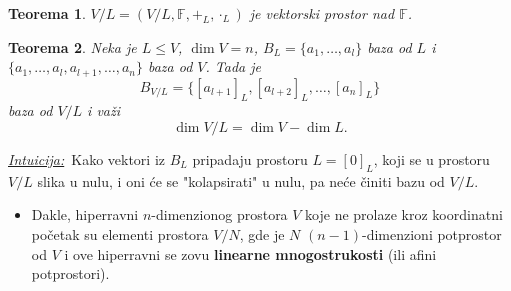 \documentclass[a4paper,12pt,twoside]{report}
\newtheorem{theorem}{Teorema}[section]
\numberwithin{algorithm}{section}
\newcommand{\intuicija}{\noindent\underline{\textit{Intuicija:}}\ }
\begin{document}
\begin{theorem}
    $V/L = (V/L, \mathbb{F},  +_L, \cdot_L)$ je vektorski prostor nad $\mathbb{F}$.
\end{theorem}

\begin{theorem}
    Neka je $L \leq V$, $\dim V = n$, $B_L = \{a_1, \dots, a_l\}$ baza od $L$ i $\{ a_1, \dots, a_l, a_{l+1}, \dots, a_n \}$ baza od $V$. Tada je 
    \[ B_{V/L} = \{ [a_{l+1}]_L, [a_{l+2}]_L, \dots, [a_n]_L \} \]
    baza od $V/L$ i važi
    \[ \dim V/L = \dim V - \dim L. \]
\end{theorem}
\intuicija Kako vektori iz $B_L$ pripadaju prostoru $L = [0]_L$, koji se u prostoru $V/L$ slika u nulu, i oni će se "kolapsirati" u nulu, pa neće činiti bazu od $V/L$.

\begin{itemize}
    \item Dakle, hiperravni $n$-dimenzionog prostora $V$ koje ne prolaze kroz koordinatni početak su elementi prostora $V/N$, gde je $N$ $(n-1)$-dimenzioni potprostor od $V$ i ove hiperravni se zovu \textbf{linearne mnogostrukosti} (ili afini potprostori).
\end{itemize}
\end{document}
